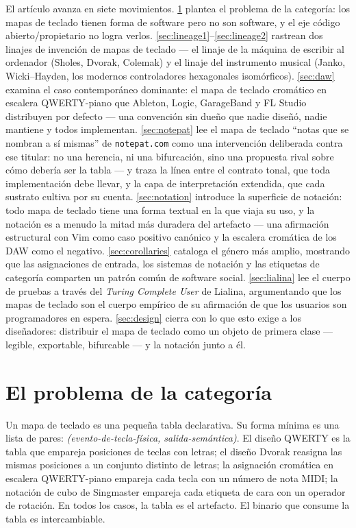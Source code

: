 \documentclass[10pt,letterpaper,twocolumn]{article}
\begin{document}
El artículo avanza en siete movimientos. \textsection\ref{sec:category} plantea el problema de la categoría: los mapas de teclado tienen forma de software pero no son software, y el eje código abierto/propietario no logra verlos. \textsection\ref{sec:lineage1}--\ref{sec:lineage2} rastrean dos linajes de invención de mapas de teclado --- el linaje de la máquina de escribir al ordenador (Sholes, Dvorak, Colemak) y el linaje del instrumento musical (Janko, Wicki--Hayden, los modernos controladores hexagonales isomórficos). \textsection\ref{sec:daw} examina el caso contemporáneo dominante: el mapa de teclado cromático en escalera QWERTY-piano que Ableton, Logic, GarageBand y FL Studio distribuyen por defecto --- una convención sin dueño que nadie diseñó, nadie mantiene y todos implementan. \textsection\ref{sec:notepat} lee el mapa de teclado ``notas que se nombran a sí mismas'' de \texttt{notepat.com} como una intervención deliberada contra ese titular: no una herencia, ni una bifurcación, sino una propuesta rival sobre cómo debería ser la tabla --- y traza la línea entre el contrato tonal, que toda implementación debe llevar, y la capa de interpretación extendida, que cada sustrato cultiva por su cuenta. \textsection\ref{sec:notation} introduce la superficie de notación: todo mapa de teclado tiene una forma textual en la que viaja su uso, y la notación es a menudo la mitad más duradera del artefacto --- una afirmación estructural con Vim como caso positivo canónico y la escalera cromática de los DAW como el negativo. \textsection\ref{sec:corollaries} cataloga el género más amplio, mostrando que las asignaciones de entrada, los sistemas de notación y las etiquetas de categoría comparten un patrón común de software social. \textsection\ref{sec:lialina} lee el cuerpo de pruebas a través del \emph{Turing Complete User} de Lialina, argumentando que los mapas de teclado son el cuerpo empírico de su afirmación de que los usuarios son programadores en espera. \textsection\ref{sec:design} cierra con lo que esto exige a los diseñadores: distribuir el mapa de teclado como un objeto de primera clase --- legible, exportable, bifurcable --- y la notación junto a él.

\section{El problema de la categoría}
\label{sec:category}

Un mapa de teclado es una pequeña tabla declarativa. Su forma mínima es una lista de pares: \emph{(evento-de-tecla-física, salida-semántica)}. El diseño QWERTY es la tabla que empareja posiciones de teclas con letras; el diseño Dvorak reasigna las mismas posiciones a un conjunto distinto de letras; la asignación cromática en escalera QWERTY-piano empareja cada tecla con un número de nota MIDI; la notación de cubo de Singmaster empareja cada etiqueta de cara con un operador de rotación. En todos los casos, la tabla es el artefacto. El binario que consume la tabla es intercambiable.
\end{document}
